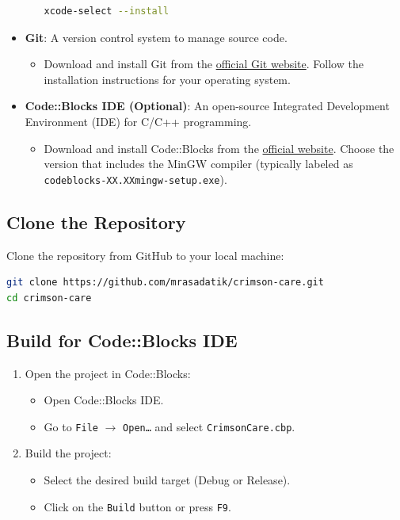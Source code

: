 \documentclass[12pt,a4paper]{report}
\begin{document}
\begin{itemize}
\begin{itemize}
\begin{lstlisting}[language=Bash, caption=GCC Installation macOS]
        xcode-select --install
        \end{lstlisting}
    \end{itemize}
    \item \normalsize \textbf{Git}: A version control system to manage source code.
    \begin{itemize}
        \item Download and install Git from the \href{https://git-scm.com/downloads}{official Git website}. Follow the installation instructions for your operating system.
    \end{itemize}
    \item \normalsize \textbf{Code::Blocks IDE (Optional)}: An open-source Integrated Development Environment (IDE) for C/C++ programming.
    \begin{itemize}
        \item Download and install Code::Blocks from the \href{https://www.codeblocks.org/downloads/binaries/}{official website}. Choose the version that includes the MinGW compiler (typically labeled as \texttt{codeblocks-XX.XXmingw-setup.exe}).
    \end{itemize}
\end{itemize}

\subsection{Clone the Repository}
Clone the repository from GitHub to your local machine:
\begin{lstlisting}[language=Bash, caption=Clone the Repository]
git clone https://github.com/mrasadatik/crimson-care.git
cd crimson-care
\end{lstlisting}

\subsection{Build for Code::Blocks IDE}
\begin{enumerate}
    \item Open the project in Code::Blocks:
    \begin{itemize}
        \item Open Code::Blocks IDE.\
        \item Go to \texttt{File} $\rightarrow$ \texttt{Open\ldots} and select \texttt{CrimsonCare.cbp}.
    \end{itemize}
    \item Build the project:
    \begin{itemize}
        \item Select the desired build target (Debug or Release).
        \item Click on the \texttt{Build} button or press \texttt{F9}.
    \end{itemize}
\end{enumerate}
\end{document}
